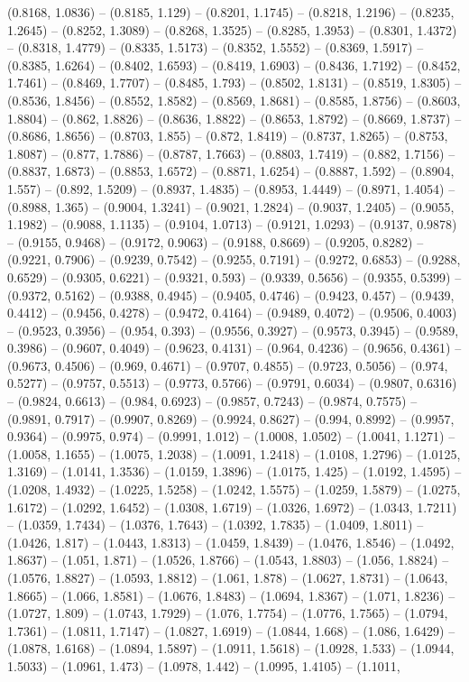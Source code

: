 (0.8168, 1.0836) -- (0.8185, 1.129) -- (0.8201, 1.1745) -- (0.8218, 1.2196) -- (0.8235, 1.2645) -- (0.8252, 1.3089) -- (0.8268, 1.3525) -- (0.8285, 1.3953) -- (0.8301, 1.4372) -- (0.8318, 1.4779) -- (0.8335, 1.5173) -- (0.8352, 1.5552) -- (0.8369, 1.5917) -- (0.8385, 1.6264) -- (0.8402, 1.6593) -- (0.8419, 1.6903) -- (0.8436, 1.7192) -- (0.8452, 1.7461) -- (0.8469, 1.7707) -- (0.8485, 1.793) -- (0.8502, 1.8131) -- (0.8519, 1.8305) -- (0.8536, 1.8456) -- (0.8552, 1.8582) -- (0.8569, 1.8681) -- (0.8585, 1.8756) -- (0.8603, 1.8804) -- (0.862, 1.8826) -- (0.8636, 1.8822) -- (0.8653, 1.8792) -- (0.8669, 1.8737) -- (0.8686, 1.8656) -- (0.8703, 1.855) -- (0.872, 1.8419) -- (0.8737, 1.8265) -- (0.8753, 1.8087) -- (0.877, 1.7886) -- (0.8787, 1.7663) -- (0.8803, 1.7419) -- (0.882, 1.7156) -- (0.8837, 1.6873) -- (0.8853, 1.6572) -- (0.8871, 1.6254) -- (0.8887, 1.592) -- (0.8904, 1.557) -- (0.892, 1.5209) -- (0.8937, 1.4835) -- (0.8953, 1.4449) -- (0.8971, 1.4054) -- (0.8988, 1.365) -- (0.9004, 1.3241) -- (0.9021, 1.2824) -- (0.9037, 1.2405) -- (0.9055, 1.1982) -- (0.9088, 1.1135) -- (0.9104, 1.0713) -- (0.9121, 1.0293) -- (0.9137, 0.9878) -- (0.9155, 0.9468) -- (0.9172, 0.9063) -- (0.9188, 0.8669) -- (0.9205, 0.8282) -- (0.9221, 0.7906) -- (0.9239, 0.7542) -- (0.9255, 0.7191) -- (0.9272, 0.6853) -- (0.9288, 0.6529) -- (0.9305, 0.6221) -- (0.9321, 0.593) -- (0.9339, 0.5656) -- (0.9355, 0.5399) -- (0.9372, 0.5162) -- (0.9388, 0.4945) -- (0.9405, 0.4746) -- (0.9423, 0.457) -- (0.9439, 0.4412) -- (0.9456, 0.4278) -- (0.9472, 0.4164) -- (0.9489, 0.4072) -- (0.9506, 0.4003) -- (0.9523, 0.3956) -- (0.954, 0.393) -- (0.9556, 0.3927) -- (0.9573, 0.3945) -- (0.9589, 0.3986) -- (0.9607, 0.4049) -- (0.9623, 0.4131) -- (0.964, 0.4236) -- (0.9656, 0.4361) -- (0.9673, 0.4506) -- (0.969, 0.4671) -- (0.9707, 0.4855) -- (0.9723, 0.5056) -- (0.974, 0.5277) -- (0.9757, 0.5513) -- (0.9773, 0.5766) -- (0.9791, 0.6034) -- (0.9807, 0.6316) -- (0.9824, 0.6613) -- (0.984, 0.6923) -- (0.9857, 0.7243) -- (0.9874, 0.7575) -- (0.9891, 0.7917) -- (0.9907, 0.8269) -- (0.9924, 0.8627) -- (0.994, 0.8992) -- (0.9957, 0.9364) -- (0.9975, 0.974) -- (0.9991, 1.012) -- (1.0008, 1.0502) -- (1.0041, 1.1271) -- (1.0058, 1.1655) -- (1.0075, 1.2038) -- (1.0091, 1.2418) -- (1.0108, 1.2796) -- (1.0125, 1.3169) -- (1.0141, 1.3536) -- (1.0159, 1.3896) -- (1.0175, 1.425) -- (1.0192, 1.4595) -- (1.0208, 1.4932) -- (1.0225, 1.5258) -- (1.0242, 1.5575) -- (1.0259, 1.5879) -- (1.0275, 1.6172) -- (1.0292, 1.6452) -- (1.0308, 1.6719) -- (1.0326, 1.6972) -- (1.0343, 1.7211) -- (1.0359, 1.7434) -- (1.0376, 1.7643) -- (1.0392, 1.7835) -- (1.0409, 1.8011) -- (1.0426, 1.817) -- (1.0443, 1.8313) -- (1.0459, 1.8439) -- (1.0476, 1.8546) -- (1.0492, 1.8637) -- (1.051, 1.871) -- (1.0526, 1.8766) -- (1.0543, 1.8803) -- (1.056, 1.8824) -- (1.0576, 1.8827) -- (1.0593, 1.8812) -- (1.061, 1.878) -- (1.0627, 1.8731) -- (1.0643, 1.8665) -- (1.066, 1.8581) -- (1.0676, 1.8483) -- (1.0694, 1.8367) -- (1.071, 1.8236) -- (1.0727, 1.809) -- (1.0743, 1.7929) -- (1.076, 1.7754) -- (1.0776, 1.7565) -- (1.0794, 1.7361) -- (1.0811, 1.7147) -- (1.0827, 1.6919) -- (1.0844, 1.668) -- (1.086, 1.6429) -- (1.0878, 1.6168) -- (1.0894, 1.5897) -- (1.0911, 1.5618) -- (1.0928, 1.533) -- (1.0944, 1.5033) -- (1.0961, 1.473) -- (1.0978, 1.442) -- (1.0995, 1.4105) -- (1.1011, 